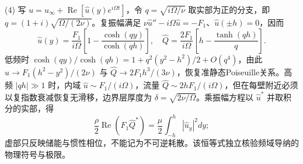 (4) 写 \(u=u_\infty+\operatorname{Re}[\widehat u(y)e^{i\Omega t}]\)，令 \(q=\sqrt{i\Omega/\nu}\) 取实部为正的分支，即 \(q=(1+i)\sqrt{\Omega/(2\nu)}\)。复振幅满足
\(\nu\widehat u''-i\Omega\widehat u=-F_1\)、\(\widehat u(\pm h)=0\)，因而
\[
\boxed{\widehat u(y)=\frac{F_1}{i\Omega}
\left[1-\frac{\cosh(qy)}{\cosh(qh)}\right]},\quad
\boxed{\widehat Q=\frac{2F_1}{i\Omega}
\left[h-\frac{\tanh(qh)}q\right]}.
\]
低频时 \(\cosh(qy)/\cosh(qh)=1+q^2(y^2-h^2)/2+O(q^4)\)，由此
\(\widehat u\to F_1(h^2-y^2)/(2\nu)\) 与
\(\widehat Q\to 2F_1h^3/(3\nu)\)，恢复准静态Poiseuille关系。高频 \(|qh|\gg1\) 时，内域 \(\widehat u\sim F_1/(i\Omega)\)，流量 \(\widehat Q\sim 2hF_1/(i\Omega)\)，但在每壁附近必须以复指数衰减恢复无滑移，边界层厚度为 \(\delta=\sqrt{2\nu/\Omega}\)。乘振幅方程以 \(\widehat u^*\) 并取积分的实部，得
\[
\boxed{\frac{\rho}{2}\operatorname{Re}(F_1\widehat Q^*)
=\frac{\mu}{2}\int_{-h}^{h}|\widehat u_y|^2dy};
\]
虚部只反映储能与惯性相位，不能记为不可逆耗散。该恒等式独立核验频域导纳的物理符号与极限。